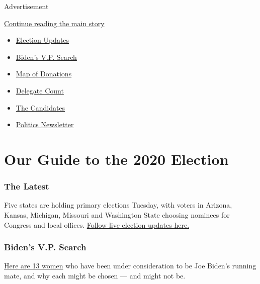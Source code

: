 Advertisement

\protect\hyperlink{after-subheader}{Continue reading the main story}

\begin{itemize}
\item
  \href{https://www.nytimes.com/2020/08/04/us/elections/primary-election-michigan-arizona-kansas.html}{Election
  Updates}
\item
  \href{https://www.nytimes.com/article/biden-vice-president-2020.html}{Biden's
  V.P. Search}
\item
  \href{https://www.nytimes.com/interactive/2020/07/24/us/politics/trump-biden-campaign-donors.html}{Map
  of Donations}
\item
  \href{https://www.nytimes.com/interactive/2020/us/elections/delegate-count-primary-results.html}{Delegate
  Count}
\item
  \href{https://www.nytimes.com/interactive/2019/us/politics/2020-presidential-candidates.html}{The
  Candidates}
\item
  \href{https://www.nytimes.com/newsletters/politics}{Politics
  Newsletter}
\end{itemize}

\hypertarget{our-guide-to-the-2020-election}{%
\section{Our Guide to the 2020
Election}\label{our-guide-to-the-2020-election}}

\hypertarget{the-latest}{%
\subsubsection{The Latest}\label{the-latest}}

Five states are holding primary elections Tuesday, with voters in
Arizona, Kansas, Michigan, Missouri and Washington State choosing
nominees for Congress and local offices.
\href{https://www.nytimes.com/2020/08/04/us/elections/primary-election-michigan-arizona-kansas.html}{Follow
live election updates here.}

\hypertarget{bidens-vp-search}{%
\subsubsection{Biden's V.P. Search}\label{bidens-vp-search}}

\href{https://www.nytimes.com/article/biden-vice-president-2020.html}{Here
are 13 women} who have been under consideration to be Joe Biden's
running mate, and why each might be chosen --- and might not be.

